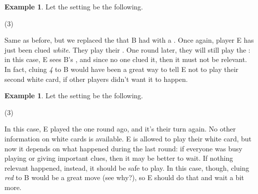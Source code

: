 \documentclass[a4paper]{article}
\theoremstyle{plain}
\theoremstyle{definition}
\newtheorem{example}[theorem]{Example}
\begin{document}
\begin{example}
	
	Let the setting be the following.
	
	\begin{tasks}(3)
		\task[+]      
		\task[A]    
		\task[B]    
		\task[C]    
		\task[D]    
		\task[E]    
	\end{tasks}
	
	Same as before, but we replaced the  that B had with a . Once again, player E has just been clued \textit{white}. They play their . One round later, they will still play the : in this case, E sees B's , and since no one clued it, then it must not be relevant. In fact, cluing \textit{4} to B would have been a great way to tell E not to play their second white card, if other players didn't want it to happen.
	
\end{example}

\begin{example}
	
	Let the setting be the following.
	
	\begin{tasks}(3)
		\task[+]      
		\task[A]    
		\task[B]    
		\task[C]    
		\task[D]    
		\task[E]    
	\end{tasks}
	
	In this case, E played the  one round ago, and it's their turn again. No other information on white cards is available. E is allowed to play their white card, but now it depends on what happened during the last round: if everyone was busy playing or giving important clues, then it may be better to wait. If nothing relevant happened, instead, it should be safe to play. In this case, though, cluing \textit{red} to B would be a great move (see why?), so E should do that and wait a bit more.
	
\end{example}
\end{document}
